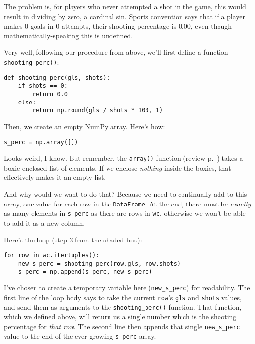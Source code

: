 
The problem is, for players who never attempted a shot in the game, this would
result in dividing by zero, a cardinal sin. Sports convention says that if a
player makes 0 goals in 0 attempts, their shooting percentage is 0.00, even
though mathematically-speaking this is undefined.

Very well, following our procedure from above, we'll first define a function
\texttt{shooting\_perc()}:

\begin{Verbatim}[fontsize=\small,samepage=true,frame=single,framesep=3mm]
def shooting_perc(gls, shots):
    if shots == 0:
        return 0.0
    else:
        return np.round(gls / shots * 100, 1)
\end{Verbatim}

Then, we create an empty NumPy array. Here's how:

\begin{Verbatim}[fontsize=\small,samepage=true,frame=single,framesep=3mm]
s_perc = np.array([])
\end{Verbatim}

Looks weird, I know. But remember, the \texttt{array()} function (review
p.~\pageref{arrayFunction}) takes a boxie-enclosed list of elements. If we
enclose \textit{nothing} inside the boxies, that effectively makes it an empty
list.

And why would we want to do that? Because we need to continually add to this
array, one value for each row in the \texttt{DataFrame}. At the end, there must
be \textit{exactly} as many elements in \texttt{s\_perc} as there are rows in
\texttt{wc}, otherwise we won't be able to add it as a new column.

Here's the loop (step 3 from the shaded box):

\begin{Verbatim}[fontsize=\small,samepage=true,frame=single,framesep=3mm]
for row in wc.itertuples():
    new_s_perc = shooting_perc(row.gls, row.shots)
    s_perc = np.append(s_perc, new_s_perc)
\end{Verbatim}

I've chosen to create a temporary variable here (\texttt{new\_s\_perc}) for
readability. The first line of the loop body says to take the current
\texttt{row}'s \texttt{gls} and \texttt{shots} values, and send them as
arguments to the \texttt{shooting\_perc()} function. That function, which we
defined above, will return us a single number which is the shooting percentage
for \textit{that row}. The second line then appends that single
\texttt{new\_s\_perc} value to the end of the ever-growing \texttt{s\_perc}
array.


